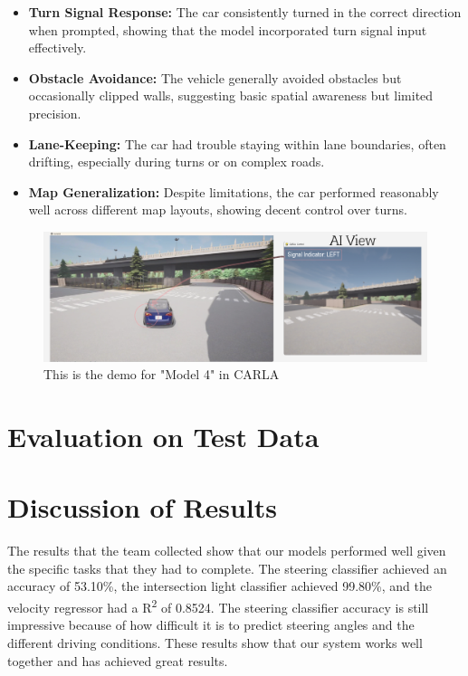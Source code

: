 \documentclass{article} %
\begin{document}
\begin{itemize}
    \item \textbf{Turn Signal Response:} The car consistently turned in the correct direction when prompted, showing that the model incorporated turn signal input effectively.

    \item \textbf{Obstacle Avoidance:} The vehicle generally avoided obstacles but occasionally clipped walls, suggesting basic spatial awareness but limited precision.

    \item \textbf{Lane-Keeping:} The car had trouble staying within lane boundaries, often drifting, especially during turns or on complex roads.

    \item \textbf{Map Generalization:} Despite limitations, the car performed reasonably well across different map layouts, showing decent control over turns.
\end{itemize}


\begin{figure}[H] %
    \centering
    \includegraphics[width=1.0\textwidth]{model4demo.png} %
    \caption{This is the demo for "Model 4" in CARLA}
    \label{fig:model4demo}
\end{figure}


\section{Evaluation on Test Data}

\section{Discussion of Results}

The results that the team collected show that our models performed well given the specific tasks that
they had to complete. The steering classifier achieved an accuracy of 53.10\%, the intersection light
classifier achieved 99.80\%, and the velocity regressor had a R\textsuperscript{2} of 0.8524. The steering
classifier accuracy is still impressive because of how difficult it is to predict steering angles and
the different driving conditions. These results show that our system works well together and has
achieved great results.
\end{document}
